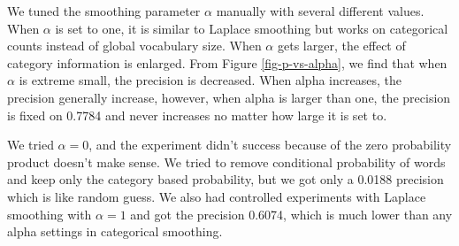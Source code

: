 We tuned the smoothing parameter $\alpha$ manually with several different values. When $\alpha$ is set to one, it is similar to Laplace smoothing but works on categorical counts instead of global vocabulary size. When $\alpha$ gets larger, the effect of category information is enlarged. From Figure \ref{fig-p-vs-alpha}, we find that when $\alpha$ is extreme small, the precision is decreased. When alpha increases, the precision generally increase, however, when alpha is larger than one, the precision is fixed on 0.7784 and never increases no matter how large it is set to.

We tried $\alpha=0$, and the experiment didn't success because of the zero probability product doesn't make sense. We tried to remove conditional probability of words and keep only the category based probability, but we got only a 0.0188 precision which is like random guess. We also had controlled experiments with Laplace smoothing with $\alpha=1$ and got the precision 0.6074, which is much lower than any alpha settings in categorical smoothing. 



